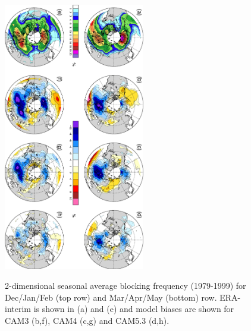 \documentclass[12pt,varwidth]{article}
\begin{document}
\pagebreak

\begin{figure}[t]
  \begin{center}
    \noindent\includegraphics[width=0.55\textwidth,angle=90.]{./figs/f_2d_block.pdf}\\
  \end{center}
  \caption{2-dimensional seasonal average blocking frequency (1979-1999) for Dec/Jan/Feb (top row) and Mar/Apr/May (bottom) row. ERA-interim is shown in (a) and (e) and model biases are shown for CAM3 (b,f), CAM4 (c,g) and CAM5.3 (d,h).} 
\label{f_2d_block}
\end{figure}

\pagebreak
\end{document}
